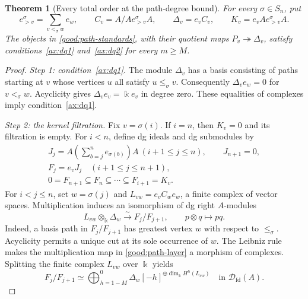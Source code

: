 \documentclass[11pt,a4paper]{article}
\newcommand{\D}{\mathcal D}
\newcommand{\std}{\Delta}
\DeclareMathOperator{\fd}{fd}
\theoremstyle{plain}
\newtheorem{theorem}{Theorem}[section]
\theoremstyle{definition}
\numberwithin{equation}{section}
\begin{document}
\begin{theorem}[Every total order at the path-degree bound]
\label{good:every-order}
For every $\sigma\in S_n$, put
\begin{equation}\label{good:path-standards}
 e_{>v}^{\sigma}=\sum_{v<_\sigma w}e_w,\qquad
 C_v=A/Ae_{>v}^{\sigma}A,\qquad
 \std_v=e_vC_v,\qquad K_v=e_vAe_{>v}^{\sigma}A.
\end{equation}
The objects in \eqref{good:path-standards}, with their quotient maps
$P_v\twoheadrightarrow\std_v$, satisfy
conditions~\ref{ax:dq1} and~\ref{ax:dq2} for every $m\geq M$.
\end{theorem}
\begin{proof}
\noindent\textit{Step 1: condition~\ref{ax:dq1}.}
The module $\std_v$ has a basis consisting of paths starting at $v$
whose vertices $u$ all satisfy $u\leq_\sigma v$.
Consequently $\std_ve_w=0$ for $v<_\sigma w$.
Acyclicity gives $\std_ve_v=\Bbbk e_v$ in degree zero.
These equalities of complexes imply condition~\ref{ax:dq1}.

\noindent\textit{Step 2: the kernel filtration.}
Fix $v=\sigma(i)$. If $i=n$, then $K_v=0$ and its filtration is
empty. For $i<n$, define dg ideals and dg submodules by
\begin{equation}\label{good:path-tower}
 \begin{gathered}
 J_j=A\left(\sum_{b=j}^n e_{\sigma(b)}\right)A
 \ (i+1\leq j\leq n),\qquad J_{n+1}=0,\\
 F_j=e_vJ_j\quad(i+1\leq j\leq n+1),\\
 0=F_{n+1}\subseteq F_n\subseteq\cdots\subseteq F_{i+1}=K_v.
 \end{gathered}
\end{equation}
For $i<j\leq n$, set $w=\sigma(j)$ and
$L_{vw}=e_vC_we_w$, a finite complex of vector spaces.
Multiplication induces an isomorphism of dg right $A$-modules
\begin{equation}\label{good:path-layer}
 L_{vw}\otimes_{\Bbbk}\std_w\xrightarrow{\sim}F_j/F_{j+1},
 \qquad p\otimes q\longmapsto pq.
\end{equation}
Indeed, a basis path in $F_j/F_{j+1}$ has greatest vertex $w$ with
respect to $\leq_\sigma$. Acyclicity permits a unique cut at its
sole occurrence of $w$. The Leibniz rule makes the multiplication
map in \eqref{good:path-layer} a morphism of complexes.
Splitting the finite complex $L_{vw}$ over $\Bbbk$ yields
\begin{equation}\label{good:path-factors}
 F_j/F_{j+1}\simeq
 \bigoplus_{h=1-M}^{0}
 \std_w[-h]^{\oplus\dim_{\Bbbk}H^h(L_{vw})}
 \quad\text{in }\D_{\fd}(A).
\end{equation}


\end{proof}
\end{document}
